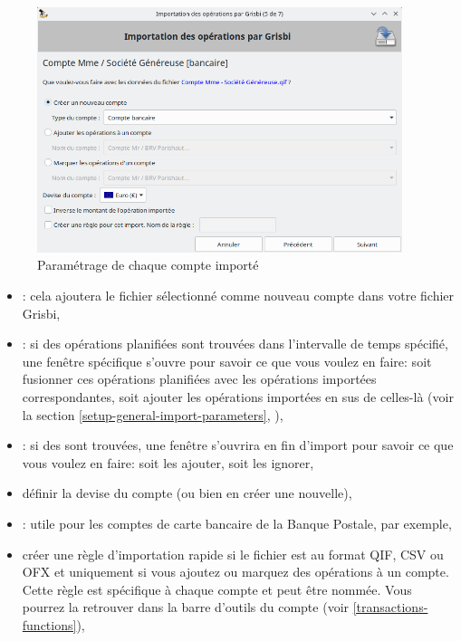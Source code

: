 \begin{enumerate}
	\begin{figure}[htbp]
		\begin{center}
		\includegraphics[width=0.95\textwidth]{image/screenshot/importexport_import_files_setup}
		\end{center}
		\caption{Paramétrage de chaque compte importé}
		\label{importexport-import-files-setup-img}
	\end{figure}
		\begin{itemize}
			\item {}: cela ajoutera le fichier sélectionné comme nouveau compte dans votre fichier Grisbi,
			\item {}: si des opérations planifiées sont trouvées dans l'intervalle de temps spécifié, une fenêtre spécifique s'ouvre pour savoir ce que vous voulez en faire: soit fusionner ces opérations planifiées avec les opérations importées correspondantes, soit ajouter les opérations importées en sus de celles-là (voir la section \vref{setup-general-import-parameters}, ),
			\item {}: si des  sont trouvées, une fenêtre s'ouvrira en fin d'import pour savoir ce que vous voulez en faire: soit les ajouter, soit les ignorer,
			\item définir la devise du compte (ou bien en créer une nouvelle),
			\item {}: utile pour les comptes de carte bancaire de la Banque Postale, par exemple,
			\item créer une règle d'importation rapide si le fichier est au format \gls{QIF}, \gls{CSV} ou \gls{OFX} et uniquement si vous ajoutez ou marquez des opérations à un compte. Cette règle est spécifique à chaque compte et peut être nommée. Vous pourrez la retrouver dans la barre d'outils du compte (voir \vref{transactions-functions}),%

\end{itemize}
\end{enumerate}
